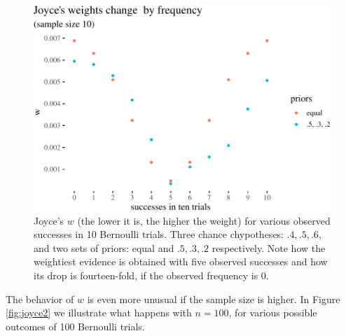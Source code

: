 \documentclass[
  10pt,
  dvipsnames,enabledeprecatedfontcommands]{scrartcl}
\begin{document}
\begin{figure}

\begin{center}\includegraphics[width=1\linewidth]{imprecision_weight_files/figure-latex/joyce1-1} \end{center}

\caption{Joyce's $w$ (the lower it is, the higher the weight) for various observed successes in 10 Bernoulli trials. Three chance chypotheses: $.4, .5, .6$, and two sets of priors: equal and $.5, .3, .2$ respectively. Note how the weightiest evidence is obtained with five observed successes and how its drop is fourteen-fold, if the observed frequency is 0.}
\label{fig:joyce1}
\end{figure}

The behavior of \(w\) is even more unusual if the sample size is higher.
In Figure \ref{fig:joyce2} we illustrate what happens with \(n=100\),
for various possible outcomes of 100 Bernoulli trials.
\end{document}
